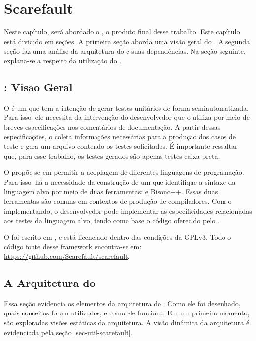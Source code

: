 \chapter[Scarefault]{Scarefault}
Neste capítulo, será abordado o \Scarefault, o produto final desse
trabalho. Este capítulo está dividido em seções. A primeira seção aborda
uma visão geral do \Scarefault. A segunda seção faz uma análise da
arquitetura do \framework e suas dependências. Na seção seguinte, explana-se
a respeito da utilização do \Scarefault.

\section{\Scarefault: Visão Geral}
O \scarefault é um \framework que tem a intenção de gerar testes unitários
de forma semiautomatizada. Para isso, ele necessita da intervenção do
desenvolvedor que o utiliza por meio de breves especificações nos
comentários de documentação. A partir dessas especificações, o \scarefault
coleta informações necessárias para a produção dos casos de teste e gera
um arquivo contendo os testes solicitados. É importante ressaltar que,
para esse trabalho, os testes gerados são apenas testes caixa preta.

O \framework propõe-se em permitir a acoplagem de diferentes linguagens
de programação. Para isso, há a necessidade da construção de um \parser
que identifique a sintaxe da linguagem alvo por meio de duas
ferramentas: \flexcpp e \textsf{Bisonc++}. Essas duas ferramentas são
comuns em contextos de produção de compiladores. Com o \parser
implementando, o desenvolvedor pode implementar as especificidades
relacionadas aos testes da linguagem alvo, tendo como base o código
oferecido pelo \Scarefault.

O \scarefault foi escrito em \cpp, e está licenciado dentro das condições
da \textsf{GPLv3}. Todo o código fonte desse framework encontra-se em:
\url{https://github.com/Scarefault/scarefault}.

\section{A Arquitetura do \scarefault} \label{sec-arq-scarefault}
Essa seção evidencia os elementos da arquitetura do \Scarefault. Como
ele foi desenhado, quais conceitos foram utilizados, e como ele funciona.
Em um primeiro momento, são exploradas visões estáticas da arquitetura.
A visão dinâmica da arquitetura é evidenciada pela seção \ref{sec-util-scarefault}.

